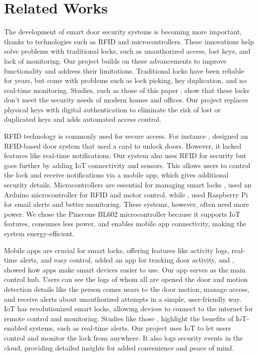 \documentclass[USenglish,oneside,twocolumn]{article}
\begin{document}
    \section{Related Works}
	\label{sec:Related Works}

The development of smart door security systems is becoming more important, thanks to technologies such as RFID and microcontrollers. These innovations help solve problems with traditional locks, such as unauthorized access, lost keys, and lack of monitoring. Our project builds on these advancements to improve functionality and address their limitations. Traditional locks have been reliable for years, but come with problems such as lock picking, key duplication, and no real-time monitoring. Studies, such as those of this paper \cite{Shetty2020}, show that these locks don’t meet the security needs of modern homes and offices. Our project replaces physical keys with digital authentication to eliminate the risk of lost or duplicated keys and adds automated access control.

RFID technology is commonly used for secure access. For instance \cite{Ortiz2021}, designed an RFID-based door system that used a card to unlock doors. However, it lacked features like real-time notifications. Our system also uses RFID for security but goes further by adding IoT connectivity and sensors. This allows users to control the lock and receive notifications via a mobile app, which gives additional security details. Microcontrollers are essential for managing smart locks \cite{Ortiz2021}, used an Arduino microcontroller for RFID and motor control, while \cite{Edozie2020}, used Raspberry Pi for email alerts and better monitoring. These systems, however, often need more power. We chose the Pinecone BL602 microcontroller because it supports IoT features, consumes less power, and enables mobile app connectivity, making the system energy-efficient.

Mobile apps are crucial for smart locks, offering features like activity logs, real-time alerts, and easy control\cite{Edozie2020}, added an app for tracking door activity, and \cite{Tewari2021}, showed how apps make smart devices easier to use. Our app serves as the main control hub. Users can see the logs of whom all are opened the door and motion detection details like the person comes nears to the door motion, manage access, and receive alerts about unauthorized attempts in a simple, user-friendly way. IoT has revolutionized smart locks, allowing devices to connect to the internet for remote control and monitoring. Studies like those \cite{Edozie2020}, highlight the benefits of IoT-enabled systems, such as real-time alerts. Our project uses IoT to let users control and monitor the lock from anywhere. It also logs security events in the cloud, providing detailed insights for added convenience and peace of mind.
\end{document}
